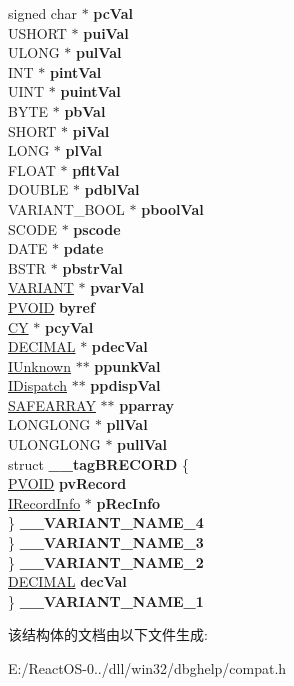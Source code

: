 \begin{DoxyCompactItemize}
\begin{tabbing}
\>\>\>signed char $\ast$ {\bfseries pcVal}\\
\>\>\>USHORT $\ast$ {\bfseries puiVal}\\
\>\>\>ULONG $\ast$ {\bfseries pulVal}\\
\>\>\>INT $\ast$ {\bfseries pintVal}\\
\>\>\>UINT $\ast$ {\bfseries puintVal}\\
\>\>\>BYTE $\ast$ {\bfseries pbVal}\\
\>\>\>SHORT $\ast$ {\bfseries piVal}\\
\>\>\>LONG $\ast$ {\bfseries plVal}\\
\>\>\>FLOAT $\ast$ {\bfseries pfltVal}\\
\>\>\>DOUBLE $\ast$ {\bfseries pdblVal}\\
\>\>\>VARIANT\_BOOL $\ast$ {\bfseries pboolVal}\\
\>\>\>SCODE $\ast$ {\bfseries pscode}\\
\>\>\>DATE $\ast$ {\bfseries pdate}\\
\>\>\>BSTR $\ast$ {\bfseries pbstrVal}\\
\>\>\>\hyperlink{structtag_v_a_r_i_a_n_t}{VARIANT} $\ast$ {\bfseries pvarVal}\\
\>\>\>\hyperlink{interfacevoid}{PVOID} {\bfseries byref}\\
\>\>\>\hyperlink{uniontag_c_y}{CY} $\ast$ {\bfseries pcyVal}\\
\>\>\>\hyperlink{structtag_d_e_c}{DECIMAL} $\ast$ {\bfseries pdecVal}\\
\>\>\>\hyperlink{interface_i_unknown}{IUnknown} $\ast$$\ast$ {\bfseries ppunkVal}\\
\>\>\>\hyperlink{interface_i_dispatch}{IDispatch} $\ast$$\ast$ {\bfseries ppdispVal}\\
\>\>\>\hyperlink{structtag_s_a_f_e_a_r_r_a_y}{SAFEARRAY} $\ast$$\ast$ {\bfseries pparray}\\
\>\>\>LONGLONG $\ast$ {\bfseries pllVal}\\
\>\>\>ULONGLONG $\ast$ {\bfseries pullVal}\\
\>\>\>struct {\bfseries \_\_tagBRECORD} \{\\
\>\>\>\>\hyperlink{interfacevoid}{PVOID} {\bfseries pvRecord}\\
\>\>\>\>\hyperlink{interface_i_record_info}{IRecordInfo} $\ast$ {\bfseries pRecInfo}\\
\>\>\>\} {\bfseries \_\_VARIANT\_NAME\_4}\\
\>\>\} {\bfseries \_\_VARIANT\_NAME\_3}\\
\>\} {\bfseries \_\_VARIANT\_NAME\_2}\\
\>\hyperlink{structtag_d_e_c}{DECIMAL} {\bfseries decVal}\\
\} {\bfseries \_\_VARIANT\_NAME\_1}\\

\end{tabbing}\end{DoxyCompactItemize}


该结构体的文档由以下文件生成\+:\begin{DoxyCompactItemize}
\item 
E\+:/\+React\+O\+S-\/0../dll/win32/dbghelp/compat.\+h\end{DoxyCompactItemize}
